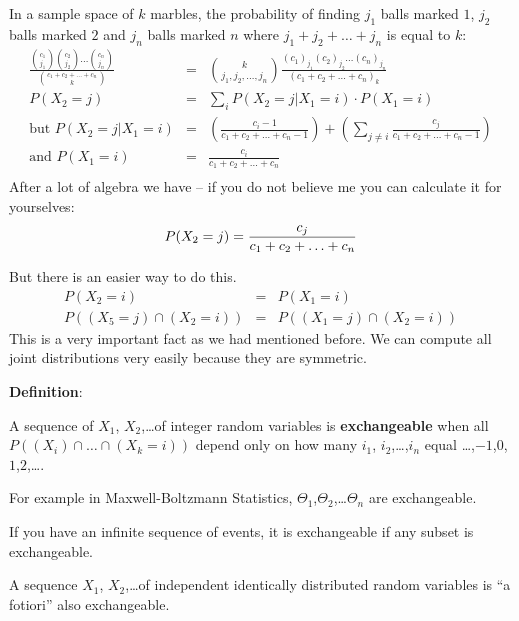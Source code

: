 In a sample space of $k$ marbles, the probability of finding $j_1$
balls marked $1$, $j_2$ balls marked $2$ and $j_n$ balls marked $n$
where $j_1+j_2+\ldots+j_n$ is equal to $k$:
\begin{eqnarray*}
\frac{{{c_1}\choose{j_1}} {{c_2}\choose{j_2}} \ldots
{{c_n}\choose{j_n}}}{{{c_1+c_2+\ldots+c_n}\choose{k}}} &=& 
{{k}\choose{j_1, j_2,\ldots,j_n}} \frac{(c_1)_{j_1} (c_2)_{j_2} \ldots
(c_n)_{j_n}}{(c_1+c_2+\ldots+c_n)_{k}}\\
P(X_2=j) &=& \sum_{i} P(X_2=j|X_1=i) \cdot P(X_1=i)\\
\mbox{but } P(X_2=j|X_1=i) &=& (\frac{c_i-1}{c_1+c_2+\ldots+c_n-1})+ 
(\sum_{j\not=i} \frac{c_j}{c_1+c_2+\ldots+c_n-1})\\
\mbox{and }P(X_1=i) &=& \frac{c_i}{c_1+c_2+\ldots+c_n}\\
\end{eqnarray*}
After a lot of algebra we have -- if you do not believe me you can
calculate it for yourselves:
\begin{equation}
P(X_2=j)= \frac{c_{j}}{c_1+c_2+\ldots+c_n}\\
\end{equation}

But there is an easier way to do this. 
\begin{eqnarray*}
P(X_2=i) &=& P(X_1=i)\\
P((X_5=j) \cap (X_2=i)) &=& P((X_1=j) \cap (X_2 =i))
\end{eqnarray*}
This is a very important fact as we had mentioned before.
We can compute all joint distributions very easily because they
are symmetric.

{\bf Definition}:

A sequence of $X_1$, $X_2$,\ldots of integer random variables is
{\bf exchangeable} when all \\
$P((X_i) \cap \ldots \cap (X_k=i))$ depend
only on how many $i_1$, $i_2$,\ldots,$i_n$ equal
\ldots,$-1$,$0$,$1$,$2$,\ldots.

For example in Maxwell-Boltzmann Statistics,
$\Theta_1$,$\Theta_2$,\ldots$\Theta_n$ are exchangeable.

If you have an infinite sequence of events, it is exchangeable if any
subset is exchangeable.

A sequence $X_1$, $X_2$,\ldots of independent identically distributed
random variables is ``a fotiori'' also exchangeable.

